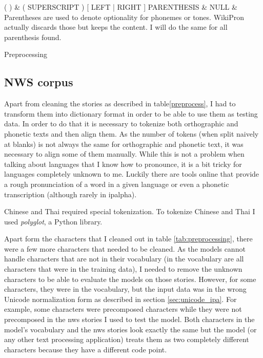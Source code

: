 {\begin{tabularx}{\textwidth}
\hline
( ) 						& \scriptsize{( SUPERSCRIPT ) [ LEFT | RIGHT ] PARENTHESIS}		& NULL							& Parentheses are used to denote optionality for phonemes or tones. WikiPron actually discards those but keeps the content. I will do the same for all parenthesis found.  \\\hline
\end{tabularx}}{Preprocessing}

\subsection*{NWS corpus}
Apart from cleaning the stories as described in table\ref{preprocess}, I had to transform them into dictionary format in order to be able to use them as testing data. In order to do that it is necessary to tokenize both orthographic and phonetic texts and then align them. As the number of tokens (when split naively at blanks) is not always the same for orthographic and phonetic text, it was necessary to align some of them manually. While this is not a problem when talking about languages that I know how to pronounce, it is a bit tricky for languages completely unknown to me. Luckily there are tools online that provide a rough pronunciation of a word in a given language or even a phonetic transcription (although rarely in \ac{ipalpha}). 

Chinese and Thai required special tokenization. To tokenize Chinese and Thai I used \textit{polyglot}, a Python library.

Apart form the characters that I cleaned out in table \ref{tab:preprocessing}, there were a few more characters that needed to be cleaned. 
As the models cannot handle characters that are not in their vocabulary (in the vocabulary are all characters that were in the training data), I needed to remove the unknown characters to be able to evaluate the models on those stories. However, for some characters, they were in the vocabulary, but the input data was in the wrong Unicode normalization form as described in section \ref{sec:unicode_ipa}. For example, some characters were precomposed characters while they were not precomposed in the \ac{nws} stories I used to test the model. Both characters in the model's vocabulary and the \ac{nws} stories look exactly the same but the model (or any other text processing application) treats them as two completely different characters because they have a different code point. 


